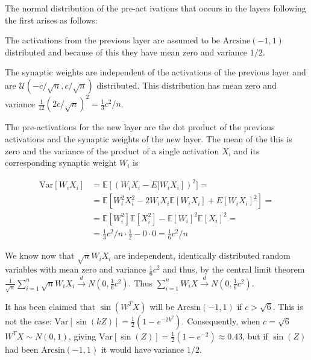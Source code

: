 \documentclass{letter}
\begin{document}
\begin{center}

\end{center}

The normal distribution of the pre-act	ivations that occurs in the layers following the first arises as follows:

The activations from the previous layer are assumed to be $\text{Arcsine}(-1,1)$ distributed and because of this they have mean zero and variance $1/2$.

The synaptic weights are independent of the activations of the previous layer and are $\mathcal{U}(-c/\sqrt{n}, c/\sqrt{n})$ distributed. This distribution has mean zero and variance $\frac{1}{12}(2c/\sqrt{n})^2=\frac{1}{3}c^2/n$.

The pre-activations for the new layer are the dot product of the previous activations and the synaptic weights of the new layer. The mean of the this is zero and the variance of the product of a single activation $X_i$ and its corresponding synaptic weight $W_i$ is 

\begin{equation*}
\begin{split}
\text{Var}[W_iX_i]&=\mathbb{E}\left[\left(W_iX_i - E[W_iX_i\right]\right)^2]=\\
                  &=\mathbb{E}\left[W_i^2X_i^2 - 2W_iX_i\mathbb{E}\left[W_iX_i\right]+E[W_iX_i]^2\right]=\\
                  &=\mathbb{E}\left[W_i^2\right]\mathbb{E}\left[X_i^2\right] - \mathbb{E}\left[W_i\right]^2\mathbb{E}\left[X_i\right]^2=\\
                  &=\frac{1}{3}c^2/n \cdot \frac{1}{2} - 0\cdot 0 = \frac{1}{6}c^2/n
\end{split}
\end{equation*}

We know now that $\sqrt{n}W_iX_i$ are independent, identically distributed random variables with mean zero and variance $\frac{1}{6}c^2$ and thus, by the central limit theorem $\frac{1}{\sqrt{n}}\sum_{i=1}^n \sqrt{n}W_iX_i \overset{d}{\rightarrow} N\left(0, \frac{1}{6}c^2\right)$. Thus $\sum_{i=1}^n W_iX \overset{d}{\rightarrow} N(0, \frac{1}{6}c^2)$.

It has been claimed that $\sin(W^TX)$ will be $\text{Arcsin}(-1,1)$ if $c > \sqrt{6}$. This is not the case: $\text{Var}[\sin(kZ)]=\frac{1}{2}(1-e^{-2k^2})$. Consequently, when $c=\sqrt{6}$ $W^TX \sim N(0, 1)$, giving $\text{Var}[\sin(Z)]=\frac{1}{2}(1-e^{-2})\approx 0.43$, but if $\sin(Z)$ had been $\text{Arcsin}(-1,1)$ it would have variance $1/2$.
\end{document}
